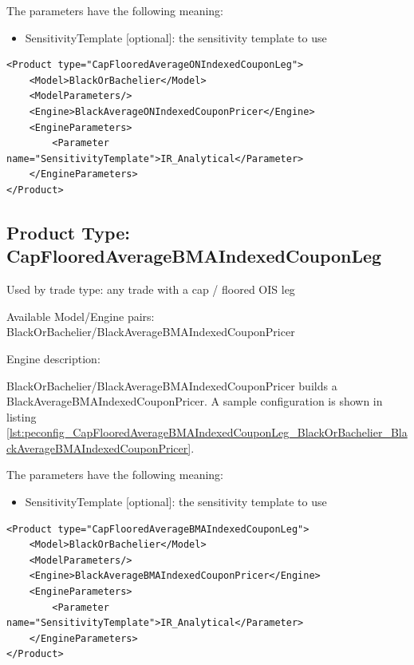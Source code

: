 The parameters have the following meaning:

\begin{itemize}
\item SensitivityTemplate [optional]: the sensitivity template to use
\end{itemize}

\begin{longlisting}
\begin{verbatim}
<Product type="CapFlooredAverageONIndexedCouponLeg">
    <Model>BlackOrBachelier</Model>
    <ModelParameters/>
    <Engine>BlackAverageONIndexedCouponPricer</Engine>
    <EngineParameters>
        <Parameter name="SensitivityTemplate">IR_Analytical</Parameter>
    </EngineParameters>
</Product>
\end{verbatim}
\caption{Configuration for Product CapFlooredAverageONIndexedCouponLeg, Model BlackOrBachelier, Engine BlackAverageONIndexedCouponPricer}
\label{lst:peconfig_CapFlooredAverageONIndexedCouponLeg_BlackOrBachelier_BlackAverageONIndexedCouponPricer}
\end{longlisting}

\subsection{Product Type: CapFlooredAverageBMAIndexedCouponLeg}

Used by trade type: any trade with a cap / floored OIS leg

Available Model/Engine pairs: BlackOrBachelier/BlackAverageBMAIndexedCouponPricer

Engine description:

BlackOrBachelier/BlackAverageBMAIndexedCouponPricer builds a BlackAverageBMAIndexedCouponPricer. A sample configuration is
shown in listing \ref{lst:peconfig_CapFlooredAverageBMAIndexedCouponLeg_BlackOrBachelier_BlackAverageBMAIndexedCouponPricer}.

The parameters have the following meaning:

\begin{itemize}
\item SensitivityTemplate [optional]: the sensitivity template to use
\end{itemize}

\begin{longlisting}
\begin{verbatim}
<Product type="CapFlooredAverageBMAIndexedCouponLeg">
    <Model>BlackOrBachelier</Model>
    <ModelParameters/>
    <Engine>BlackAverageBMAIndexedCouponPricer</Engine>
    <EngineParameters>
        <Parameter name="SensitivityTemplate">IR_Analytical</Parameter>
    </EngineParameters>
</Product>
\end{verbatim}
\caption{Configuration for Product CapFlooredAverageBMAIndexedCouponLeg, Model BlackOrBachelier, Engine BlackAverageBMAIndexedCouponPricer}
\label{lst:peconfig_CapFlooredAverageBMAIndexedCouponLeg_BlackOrBachelier_BlackAverageBMAIndexedCouponPricer}
\end{longlisting}

